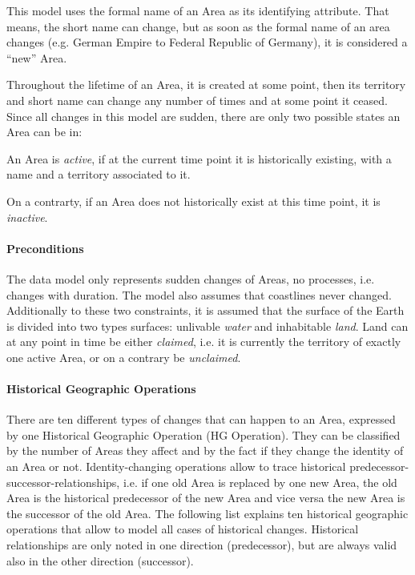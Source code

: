 This model uses the formal name of an Area as its identifying attribute. That means, the short name can change, but as soon as the formal name of an area changes (e.g. German Empire to Federal Republic of Germany), it is considered a ``new'' Area.

Throughout the lifetime of an Area, it is created at some point, then its territory and short name can change any number of times and at some point it ceased. Since all changes in this model are sudden, there are only two possible states an Area can be in:
\begin{compactenum}
  \item An Area is \emph{active}, if at the current time point it is historically existing, with a name and a territory associated to it.
  \item On a contrarty, if an Area does not historically exist at this time point, it is \emph{inactive}.
\end{compactenum}


\paragraph{Preconditions} %
\label{par:preconditions}

The data model only represents sudden changes of Areas, no processes, i.e. changes with duration. The model also assumes that coastlines never changed. Additionally to these two constraints, it is assumed that the surface of the Earth is divided into two types surfaces: unlivable \emph{water} and inhabitable \emph{land}. Land can at any point in time be either \emph{claimed}, i.e. it is currently the territory of exactly one active Area, or on a contrary be \emph{unclaimed}.


\paragraph{Historical Geographic Operations} %
\label{par:historical_geographic_operations}

There are ten different types of changes that can happen to an Area, expressed by one Historical Geographic Operation (HG Operation). They can be classified by the number of Areas they affect and by the fact if they change the identity of an Area or not. Identity-changing operations allow to trace historical predecessor-successor-relationships, i.e. if one old Area is replaced by one new Area, the old Area is the historical predecessor of the new Area and vice versa the new Area is the successor of the old Area. The following list explains ten historical geographic operations that allow to model all cases of historical changes. Historical relationships are only noted in one direction (predecessor), but are always valid also in the other direction (successor).

